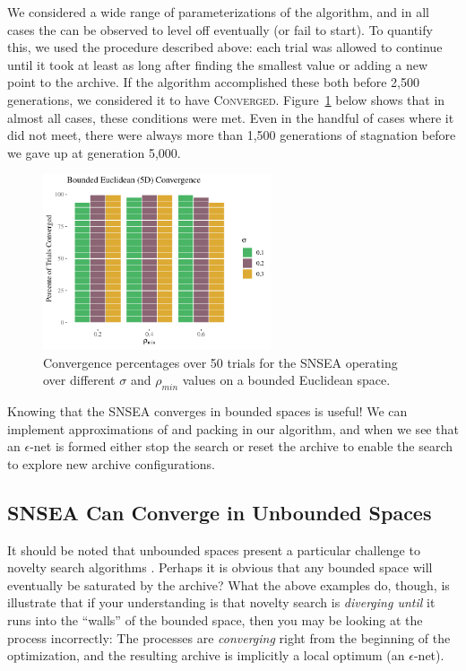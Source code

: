 \documentclass[twoside]{article}
\begin{document}
We considered a wide range of parameterizations of the algorithm, and in all cases the  can be observed to level off eventually (or fail to start).  To quantify this, we used the procedure described above:  each trial was allowed to continue until it took at least as long after finding the smallest  value or adding a new point to the archive.  If the algorithm accomplished these both before 2,500 generations, we considered it to have \textsc{Converged}.  Figure~\ref{fig:bounded:nopop:conv} below shows that in almost all cases, these conditions were met.  Even in the handful of cases where it did not meet, there were always more than 1,500 generations of stagnation before we gave up at generation 5,000.  
%
\begin{figure}[h]
  \center\includegraphics[width=0.6\textwidth]{Figures/bounded-conv-NOPOP.pdf}
  \caption{\label{fig:bounded:nopop:conv} Convergence percentages over 50 trials for the SNSEA operating over different $\sigma$ and $\rho_{min}$ values on a bounded Euclidean space.}
\end{figure}

Knowing that the SNSEA converges in bounded spaces is useful! We can implement approximations of  and packing in our algorithm, and when we see that an $\epsilon$-net is formed either stop the search or reset the archive to enable the search to explore new archive configurations.  


\subsection{SNSEA Can Converge in Unbounded Spaces}
\label{subsec:unbounded}

It should be noted that unbounded spaces present a particular challenge to novelty search algorithms \citep{LehmanStanley2008ssls,Doncieux2019gecco}.  Perhaps it is obvious that any bounded space will eventually be saturated by the archive?  What the above examples do, though, is illustrate that if your understanding is that novelty search is \emph{diverging until} it runs into the ``walls'' of the bounded space, then you may be looking at the process incorrectly:  The processes are \emph{converging} right from the beginning of the optimization, and the resulting archive is implicitly a local optimum (an $\epsilon$-net).
\end{document}
